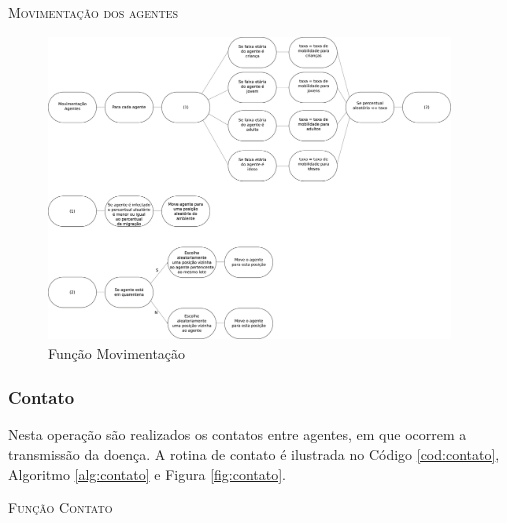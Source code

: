 

\begin{algorithm}[H]
  \SetAlgoLined   
  
  \caption{\textsc{Movimentação dos agentes}}
  \label{alg:movimentacao}
\end{algorithm}

\begin{figure}[H]
  \centering
  \includegraphics[width=0.95\textwidth]{Figuras/EstruturasDadosEstrategias/Operadores/Movimentacao.eps}
  \caption{Função Movimentação}
  \label{fig:movimentacao}
\end{figure} 

\newpage

\subsubsection{Contato}

Nesta operação são realizados os contatos entre agentes, em que ocorrem a transmissão da doença. A rotina de contato é ilustrada no Código \ref{cod:contato}, Algoritmo \ref{alg:contato} e Figura \ref{fig:contato}. 



\begin{algorithm}[H]
 \SetAlgoLined  
 
 \caption{\textsc{Função Contato}} 
 \label{alg:contato}
\end{algorithm}

